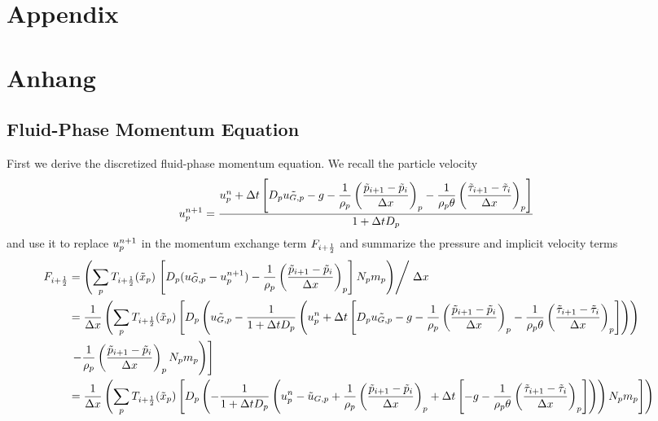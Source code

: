 
{\chapter{Appendix}}    %
{\chapter{Anhang}}      %
\label{chap:appendix}


\section{Fluid-Phase Momentum Equation}
\label{sec:appendix:fluidPhaseMomentum}
First we derive the discretized fluid-phase momentum equation. 
We recall the particle velocity
\begin{equation}
    \label{eq:advVelocity}
    u_p^{n+1} = \dfrac{u_p^n + \Delta t \left[D_p \tilde{u_{G,p}} - g - \dfrac{1}{\rho_p} \left(\dfrac{\tilde{p}_{i+1} - \tilde{p}_i}{\Delta x} \right)_p - \dfrac{1}{\rho_p \theta} \left( \dfrac{\tilde{\tau}_{i+1} - \tilde{\tau}_i}{\Delta x}\right)_p \right]}{1 + \Delta t D_p}
\end{equation}
and use it to replace $u_p^{n+1}$ in the momentum exchange term $F_{i+\frac{1}{2}}$ and summarize the pressure and implicit velocity terms
\begin{align*}
    \hspace{-0.5cm} \F_{i+\frac{1}{2}} &= \left( \sum_p \ifg_{i+\frac{1}{2}} (\xpp) \left. \left[ D_p (\tilde{\ugp} - 
    \up^{n+1} 
    ) - \dfrac{1}{\rp} \left( \dfrac{\tilde{\p}_{i+1} - \tilde{p}_i}{\Delta x}\right)_p \right] \Np \mp \right) \middle / \right. \Delta \x \\
    &=  \dfrac{1}{\Delta \x} \left( \sum_p \ifg_{i+\frac{1}{2}} (\xpp) \left[ D_p \left(\tilde{\ugp} - 
    \dfrac{1}{1 + \Delta \tvar \d}    
    \left( \up^n + \Delta \tvar \left[\d \tilde{u_{G,p}} - \g - \dfrac{1}{\rp} \left(\dfrac{\tilde{\p}_{i+1} - \tilde{\p}_i}{\Delta \x} \right)_p - \dfrac{1}{\rp \pvf} \left( \dfrac{\tilde{\ss}_{i+1} - \tilde{\ss}_i}{\Delta \x}\right)_p \right] \right) \right) \right. \right. \\
    & \left. \left. - \dfrac{1}{\rp} \left( \dfrac{\tilde{\p}_{i+1} - \tilde{p}_i}{\Delta x}\right)_p \Np \mp \right) \right] \\
    &=  \dfrac{1}{\Delta \x} \left( \sum_p \ifg_{i+\frac{1}{2}} (\xpp) \left[ D_p \left(-  \dfrac{1}{1 + \Delta \tvar \d} \left(   \up^n - \tilde{\u}_{G,p}     + \dfrac{1}{\rp} \left(\dfrac{\tilde{\p}_{i+1} - \tilde{\p}_i}{\Delta \x} \right)_p + \Delta \tvar \left[ - \g - \dfrac{1}{\rp \pvf} \left( \dfrac{\tilde{\ss}_{i+1} - \tilde{\ss}_i}{\Delta \x}\right)_p \right] \right) \right) \Np \mp \right]\right)
\end{align*}
